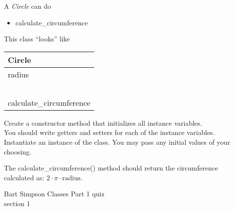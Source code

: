 \documentclass{article}
\newcommand{\tab}{\hspace*{0.25in}}
\begin{document}
\begin{enumerate}
\begin{minipage}{.6\textwidth}
		A \textit{Circle} can do
		\begin{itemize}
			\item calculate\_circumference
		\end{itemize}
	\end{minipage}
	\begin{minipage}{.4\textwidth}
		This class ``looks'' like 
				
		\vspace*{1em}
		\begin{tabular}{|l|}
			\hline Circle\\ \hline
			radius\\ \ \\  \hline
			calculate\_circumference\\ \hline
		\end{tabular}
	\end{minipage}

	\vspace*{2ex}
	Create a constructor method that initializes all instance variables.\\
	You should write getters and setters for each of the instance variables.\\
	Instantiate an instance of the class. You may pass any initial values of your choosing.	

	The calculate\_circumference() method should return the circumference calculated as: $2 \cdot \pi \cdot \text{radius}$.\\



\end{enumerate}
\pagebreak
Bart Simpson \hfill Classes Part 1 quiz\\
section 1\\
\end{document}
